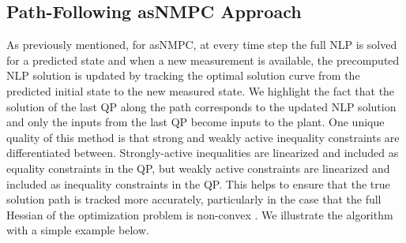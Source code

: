 \subsection{Path-Following asNMPC Approach}
As previously mentioned, for asNMPC, at every time step the full NLP is solved for a predicted state and when a new measurement is available, the precomputed NLP solution is updated by tracking the optimal solution curve from the predicted initial state to the new measured state.
We highlight the fact that the solution of the last QP along the path corresponds to the updated NLP solution and only the inputs from the last QP become inputs to the plant.
One unique quality of this method is that strong and weakly active inequality constraints are differentiated between.
Strongly-active inequalities are linearized and included as equality constraints in the QP, but weakly active constraints are linearized and included as inequality constraints in the QP.
This helps to ensure that the true solution path is tracked more accurately, particularly in the case that the full Hessian of the optimization problem is non-convex \cite{economic}.
We illustrate the algorithm with a simple example below.
\\
